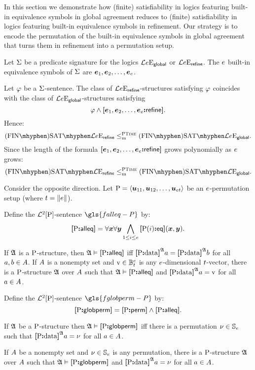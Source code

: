 
In this section we demonstrate how (finite) satisfiability in logics featuring
built-in equivalence symbols in global agreement reduces to (finite)
satisfiability in logics featuring built-in equivalence symbols in refinement.
Our strategy is to encode the permutation of the built-in equivalence symbols in
global agreement that turns them in refinement into a permutation setup.

Let $\mathrm{\Sigma}$ be a predicate signature for the logics $\mathcal{L}{e}\mathrm{E}_{\mathsf{global}}$
or $\mathcal{L}{e}\mathrm{E}_{\mathsf{refine}}$.
The $e$ built-in equivalence symbols of $\mathrm{\Sigma}$ are $\bm{e}_{1}, \bm{e}_{2}, \dots,
\bm{e}_{e}$.

Let $\varphi$ be a $\mathrm{\Sigma}$-sentence.
The class of $\mathcal{L}{e}\mathrm{E}_{\mathsf{refine}}$-structures satisfying $\varphi$
coincides with the class of $\mathcal{L}{e}\mathrm{E}_{\mathsf{global}}$-structures satisfying
\[
  \varphi \land {\bm{[}\bm{e}_{1},\bm{e}_{2},\dots,\bm{e}_{e}\mathord{\bm{:}}\mathsf{refine}\bm{]}}.
\]
Hence:
\[
  \FinASat{\Fo\Eea\sze\agrefine} \red\cP
  \FinASat{\Fo\Eea\sze\agglobal}.
\]
Since the length of the formula ${\bm{[}\bm{e}_{1},\bm{e}_{2},\dots,\bm{e}_{e}\mathord{\bm{:}}\mathsf{refine}\bm{]}}$ grows
polynomially as $e$ grows:
\[
  \FinASat{\Fo\Eea\nosze\agrefine} \red\cP
  \FinASat{\Fo\Eea\nosze\agglobal}.
\]

Consider the opposite direction.
Let ${\mathrm{P}} = \left\langle \bm{u}_{11}, \bm{u}_{12}, \dots, \bm{u}_{et} \right\rangle$ be an
$e$-permutation setup (where $t = \|e\|$).
\begin{definition}
Define the $\mathcal{L}^{2}[{\mathrm{P}}]$-sentence $\gls{falleq-P}$ by:
\[
  {\bm{[}{\mathrm{P}}\mathord{\bm{:}}\mathsf{alleq}\bm{]}} = \forall\bm{x} \forall\bm{y} \bigwedge_{1 \leq i \leq e}
  {\bm{[}{\mathrm{P}}(i)\mathord{\bm{:}}\mathsf{eq}\bm{]}}(\bm{x},\bm{y}).
\]
\end{definition}
If $\mathfrak{A}$ is a ${\mathrm{P}}$-structure, then $\mathfrak{A} \vDash {\bm{[}{\mathrm{P}}\mathord{\bm{:}}\mathsf{alleq}\bm{]}}$ iff
${\bm{[}{\mathrm{P}}\mathord{\bm{:}}\mathrm{data}\bm{]}}^{\mathfrak{A}}a = {\bm{[}{\mathrm{P}}\mathord{\bm{:}}\mathrm{data}\bm{]}}^{\mathfrak{A}}b$ for all $a, b \in A$.
If $A$ is a nonempty set and $\mathrm{v} \in \mathbb{B}_{t}^{e}$ is any
$e$-dimensional $t$-vector, there is a ${\mathrm{P}}$-structure $\mathfrak{A}$ over
$A$ such that $\mathfrak{A} \vDash {\bm{[}{\mathrm{P}}\mathord{\bm{:}}\mathsf{alleq}\bm{]}}$ and
${\bm{[}{\mathrm{P}}\mathord{\bm{:}}\mathrm{data}\bm{]}}^{\mathfrak{A}}a = \mathrm{v}$ for all $a \in A$.

\begin{definition}
Define the $\mathcal{L}^{2}[{\mathrm{P}}]$-sentence $\gls{fglobperm-P}$ by:
\[
  {\bm{[}{\mathrm{P}}\mathord{\bm{:}}\mathsf{globperm}\bm{]}} = {\bm{[}{\mathrm{P}}\mathord{\bm{:}}\mathsf{perm}\bm{]}} \land {\bm{[}{\mathrm{P}}\mathord{\bm{:}}\mathsf{alleq}\bm{]}}.
\]
\end{definition}
If $\mathfrak{A}$ be a ${\mathrm{P}}$-structure then $\mathfrak{A} \vDash {\bm{[}{\mathrm{P}}\mathord{\bm{:}}\mathsf{globperm}\bm{]}}$ iff there
is a permutation $\nu \in \mathbb{S}_{e}$ such that
${\bm{[}{\mathrm{P}}\mathord{\bm{:}}\mathrm{data}\bm{]}}^{\mathfrak{A}}a = \nu$ for all $a \in A$.

If $A$ be a nonempty set and $\nu \in \mathbb{S}_{e}$ is any permutation,
there is a ${\mathrm{P}}$-structure $\mathfrak{A}$ over $A$ such that
$\mathfrak{A} \vDash {\bm{[}{\mathrm{P}}\mathord{\bm{:}}\mathsf{globperm}\bm{]}}$ and ${\bm{[}{\mathrm{P}}\mathord{\bm{:}}\mathrm{data}\bm{]}}^{\mathfrak{A}}a = \nu$ for all 
$a \in A$.


